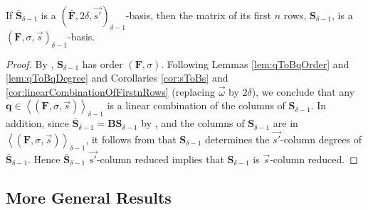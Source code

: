 \begin{lem}
\label{lem:delta-1Basis} If $\bar{\mathbf{S}}_{\delta-1}$ is a $(\bar{\mathbf{F}},2\delta,\vec{s'})_{\delta-1}$-basis,
then the matrix of its first $n$ rows, $\mathbf{S}_{\delta-1}$,
is a $\left(\mathbf{F},\sigma,\vec{s}\right)_{\delta-1}$-basis.\end{lem}
\begin{proof}
By , $\mathbf{S}_{\delta-1}$ has order
$\left(\mathbf{F},\sigma\right)$. Following Lemmas \ref{lem:qToBqOrder}
and \ref{lem:qToBqDegree} and Corollaries \ref{cor:sToBs} and \ref{cor:linearCombinationOfFirstnRows}
(replacing $\vec{\omega}$ by $2\delta$), we conclude that any $\mathbf{q}\in\left\langle \left(\mathbf{F},\sigma,\vec{s}\right)\right\rangle _{\delta-1}$
is a linear combination of the columns of $\mathbf{S}_{\delta-1}$.
In addition, since $\bar{\mathbf{S}}_{\delta-1}=\mathbf{B}\mathbf{S}_{\delta-1}$
by , and the columns of $\mathbf{S}_{\delta-1}$
are in $\left\langle \left(\mathbf{F},\sigma,\vec{s}\right)\right\rangle _{\delta-1}$,
it follows from  that $\mathbf{S}_{\delta-1}$
determines the $\vec{s'}$-column degrees of $\bar{\mathbf{S}}_{\delta-1}$.
Hence $\bar{\mathbf{S}}_{\delta-1}$ $\vec{s'}$-column reduced implies
that $\mathbf{S}_{\delta-1}$ is $\vec{s}$-column reduced. 
\end{proof}

\subsection{\label{sub:generalTransform}More General Results}

